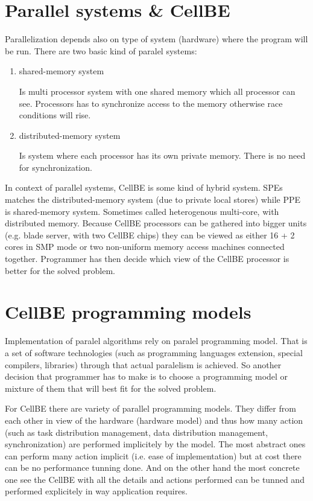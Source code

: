 \section{Parallel systems \& CellBE}

Parallelization depends also on type of system (hardware) where the program will be run.
There are two basic kind of paralel systems:
\begin{enumerate}
\item {shared-memory system}
\par
Is multi processor system with one shared memory which all processor can see.
Processors has to synchronize access to the memory otherwise race conditions will rise.

\item {distributed-memory system}
\par
Is system where each processor has its own private memory.
There is no need for synchronization.
\end{enumerate}

In context of parallel systems, CellBE is some kind of hybrid system.
SPEs matches the distributed-memory system (due to private local stores) while PPE is shared-memory system.
Sometimes called heterogenous multi-core, with distributed memory.
Because CellBE processors can be gathered into bigger units (e.g. blade server, with two CellBE chips) they can be viewed as either 16 + 2 cores in SMP mode or two non-uniform memory access machines connected together.
Programmer has then decide which view of the CellBE processor is better for the solved problem.

\section{CellBE programming models}

Implementation of paralel algorithms rely on paralel programming model.
That is a set of software technologies (such as programming languages extension, special compilers, libraries) through that actual paralelism is achieved.
So another decision that programmer has to make is to choose a programming model or mixture of them that will best fit for the solved problem.

For CellBE there are variety of parallel programming models.
They differ from each other in view of the hardware (hardware model) and thus how many action (such as task distribution management, data distribution management, synchronization) are performed implicitely by the model.
 The most abstract ones can perform many action implicit (i.e. ease of implementation) but at cost there can be no performance tunning done.
 And on the other hand the most concrete one see the CellBE with all the details and actions performed can be tunned and performed explicitely in way application requires.

